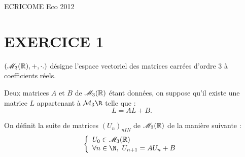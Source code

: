 \documentclass[11pt]{article}%
\begin{document}
\begin{center}
{\Huge ECRICOME Eco 2012}
\end{center}

\section*{EXERCICE 1}

$\left( \mathscr{M}_{3}(\mathbb{R}), +,\cdot.\right) $ désigne l'espace vectoriel des
matrices carrées d'ordre 3 à
coefficients réels.

Deux matrices $A$ et $B$ de $\mathscr{M}_{3}(\mathbb{R}) $ étant données, on suppose qu'il
existe une matrice $L$ appartenant à $\mathcal{M}_{3}\R$ telle que :
\[
L = AL + B.
\]

On définit la suite de matrices $\left( U_{n}\right)_{nIN}$ de $\mathscr{M}_{3}(\mathbb{R}) $
de la manière suivante :
\[
\left\{ 
\begin{array}{l}
U_{0}\in \M{3} \\
\forall n\in \N,\ U_{n + 1} = AU_{n} + B
\end{array}
\right.
\]
\end{document}

